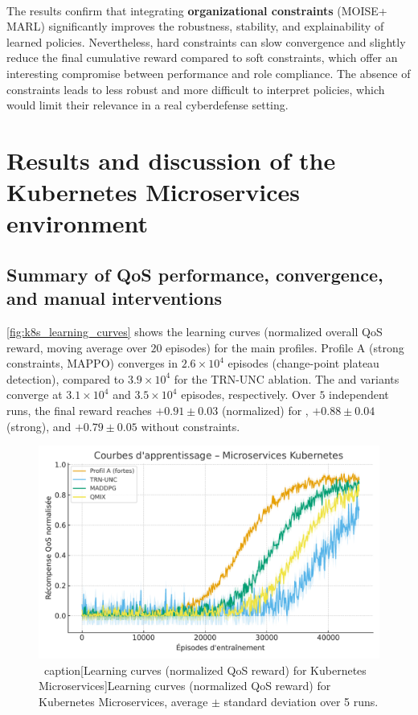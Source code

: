 \

The results confirm that integrating \textbf{organizational constraints} (MOISE+ \allowbreak MARL) significantly improves the robustness, stability, and explainability of learned policies.
Nevertheless, hard constraints can slow convergence and slightly reduce the final cumulative reward compared to soft constraints, which offer an interesting compromise between performance and role compliance.
The absence of constraints leads to less robust and more difficult to interpret policies, which would limit their relevance in a real cyberdefense setting.


\section{Results and discussion of the Kubernetes Microservices environment}\label{sec:results_and_discussion_ms}

\subsection* {Summary of QoS performance, convergence, and manual interventions}

\autoref{fig:k8s_learning_curves} shows the learning curves (normalized overall QoS reward, moving average over $20$ episodes) for the main profiles.
Profile A (strong constraints, MAPPO) converges in $2.6\times10^4$ episodes (change-point plateau detection), compared to $3.9\times10^4$ for the TRN-UNC ablation.
The  and  variants converge at $3.1\times 10^4$ and $3.5\times 10^4$ episodes, respectively.
Over $5$ independent runs, the final reward reaches $+0.91 \pm 0.03$ (normalized) for , $+0.88 \pm 0.04$ (strong), and $+0.79 \pm 0.05$ without constraints.

\begin{figure}[h!]
  \centering
  \includegraphics[width=0.75\linewidth]{figures/results_k8s_learning.pdf}
  \ caption[Learning curves (normalized QoS reward) for Kubernetes Microservices]{Learning curves (normalized QoS reward) for Kubernetes Microservices, average $\pm$ standard deviation over 5 runs.}
  \label{fig:k8s_learning_curves}
\end{figure}

